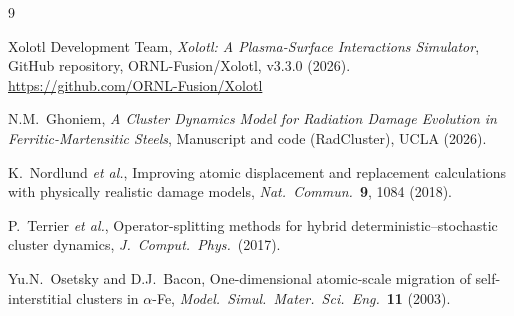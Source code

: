 \documentclass[12pt,letterpaper]{article}
\begin{document}
\begin{thebibliography}{9}

  Xolotl Development Team,
  \textit{Xolotl: A Plasma-Surface Interactions Simulator},
  GitHub repository, ORNL-Fusion/Xolotl, v3.3.0 (2026).
  \url{https://github.com/ORNL-Fusion/Xolotl}

  N.M.\ Ghoniem,
  \textit{A Cluster Dynamics Model for Radiation Damage Evolution in
  Ferritic-Martensitic Steels},
  Manuscript and code (RadCluster), UCLA (2026).

  K.\ Nordlund \textit{et al.},
  Improving atomic displacement and replacement calculations with
  physically realistic damage models,
  \textit{Nat.\ Commun.}\ \textbf{9}, 1084 (2018).

  P.\ Terrier \textit{et al.},
  Operator-splitting methods for hybrid deterministic--stochastic
  cluster dynamics,
  \textit{J.\ Comput.\ Phys.}\ (2017).

  Yu.N.\ Osetsky and D.J.\ Bacon,
  One-dimensional atomic-scale migration of self-interstitial clusters in
  $\alpha$-Fe, \textit{Model.\ Simul.\ Mater.\ Sci.\ Eng.}\ \textbf{11}
  (2003).

\end{thebibliography}
\end{document}
